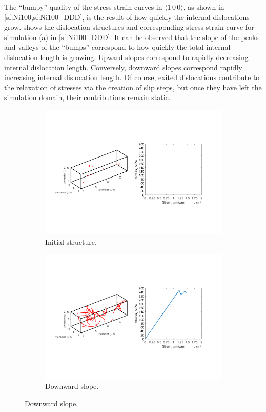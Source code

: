 The ``bumpy'' quality of the stress-strain curves in $\langle 1\, 0\, 0 \rangle$, as shown in \cref{sf:Ni100,sf:Ni100_DDD}, is the result of how quickly the internal dislocations grow.  shows the dislocation structures and corresponding stress-strain curve for simulation (a) in \cref{sf:Ni100_DDD}. It can be observed that the slope of the peaks and valleys of the ``bumps'' correspond to how quickly the total internal dislocation length is growing. Upward slopes correspond to rapidly decreasing internal dislocation length. Conversely, downward slopes correspond rapidly increasing internal dislocation length. Of course, exited dislocations contribute to the relaxation of stresses via the creation of slip steps, but once they have left the simulation domain, their contributions remain static.
\begin{figure}
    \centering
    \begin{subfigure}[t]{\linewidth}
        \centering
        \includegraphics[trim={1.75cm 5cm 2.5cm 5.5cm},clip,width=\linewidth]{../data/11-Mar-2021_8_tensile_ni_100_0.pdf}
        \caption{Initial structure.}
    \end{subfigure}

    \begin{subfigure}[t]{\linewidth}
        \centering
        \includegraphics[trim={1.75cm 5cm 2.5cm 5.5cm},clip,width=\linewidth]{../data/11-Mar-2021_8_tensile_ni_100_60000.pdf}
        \caption{Downward slope.}
    \end{subfigure}


\end{figure}
